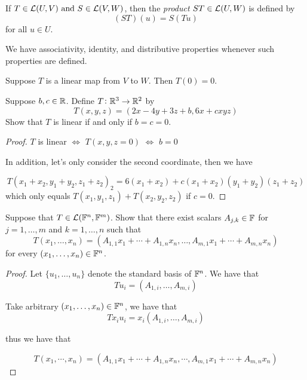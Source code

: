\documentclass{extarticle}
\begin{document}
\begin{definition}
    If \(T \in \mathcal{L}(U, V) \text{ and } S \in \mathcal{L}(V, W) \), then the \emph{product} \(ST \in \mathcal{L}(U, W)\)
    is defined by 
    \[(ST)(u) = S(Tu)\]
    for all \(u \in U\).
\end{definition}

\begin{remark}
We have associativity, identity, and distributive properties whenever such properties are defined. 
\end{remark}

\begin{thm}
    Suppose \(T\) is a linear map from \(V\) to \(W\). Then \(T(0) = 0\). 
\end{thm}

\newpage 
{}
\begin{problem}{1}
    Suppose \(b, c \in \mathbb{R}\). Define \(T \colon \mathbb{R}^3 \to \mathbb{R}^2\) by 
    \[T(x,y,z) = (2x - 4y + 3z + b, 6x + cxyz)\]
    Show that \(T\) is linear if and only if \(b = c = 0\). 
\end{problem}

\begin{proof}
\(T\) is linear \(\Longleftrightarrow\) \(T(x, y, z = 0)\)
\(\Longleftrightarrow\) \(b = 0\)

In addition, let's only consider the second coordinate, then we have 

\[T(x_1 + x_2, y_1 + y_2, z_1 + z_2)_2 = 6(x_1 + x_2) + c(x_1 + x_2)(y_1 + y_2)(z_1 + z_2)\]
which only equals \(T(x_1, y_1, z_1) + T(x_2, y_2, z_2)\) if \(c = 0\). 
\end{proof}

\begin{problem}{3}
    Suppose that \(T \in \mathcal{L}(\mathbb{F}^n, \mathbb{F}^m)\). Show that there exist scalars 
    \(A_{j,k} \in \mathbb{F}\) for \(j = 1, \ldots, m\) and \(k=1, \ldots,n\) such that 
    \[T(x_1, \ldots, x_n) = (A_{1,1}x_1 + \cdots+A_{1,n} x_n, \ldots, A_{m, 1} x_1 + \cdots + A_{m,n}x_n)\]
    for every \((x_1, \ldots, x_n) \in \mathbb{F}^n\). 
\end{problem}

\begin{proof}
Let \(\{u_1, \ldots, u_n\}\) denote the standard basis of \(\mathbb{F}^n\). We have that 
\[T u_i = (A_{1,i}, \ldots, A_{m, i})\]

Take arbitrary \((x_1, \ldots, x_n) \in \mathbb{F}^n\), we have that 
\[T x_i u_i = x_i (A_{1,i}, \ldots, A_{m, i})\]

thus we have that 

\[T(x_1, \cdots, x_n) = (A_{1,1} x_1 + \cdots + A_{1,n} x_n, \cdots, A_{m, 1}x_1 + \cdots + A_{m, n} x_n)\]
\end{proof}
\end{document}
